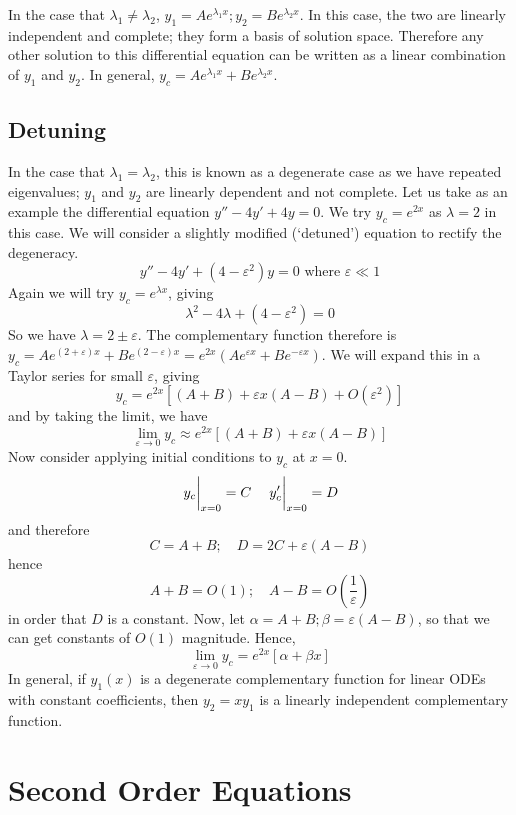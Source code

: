 \documentclass{article}
\begin{document}
In the case that $\lambda_1 \neq \lambda_2$, $y_1 = Ae^{\lambda_1 x}; y_2 = Be^{\lambda_2 x}$. In this case, the two are linearly independent and complete; they form a basis of solution space. Therefore any other solution to this differential equation can be written as a linear combination of $y_1$ and $y_2$. In general, $y_c = Ae^{\lambda_1 x} + Be^{\lambda_2 x}$.

\subsection{Detuning}
In the case that $\lambda_1 = \lambda_2$, this is known as a degenerate case as we have repeated eigenvalues; $y_1$ and $y_2$ are linearly dependent and not complete. Let us take as an example the differential equation $y'' - 4y' + 4y = 0$. We try $y_c = e^{2x}$ as $\lambda = 2$ in this case. We will consider a slightly modified (`detuned') equation to rectify the degeneracy.
\[ y'' - 4y' + (4-\varepsilon^2)y = 0 \text{ where } \varepsilon \ll 1 \]
Again we will try $y_c = e^{\lambda x}$, giving
\[ \lambda^2 - 4 \lambda + (4 - \varepsilon^2) = 0 \]
So we have $\lambda = 2 \pm \varepsilon$. The complementary function therefore is $y_c = Ae^{(2+\varepsilon)x} + Be^{(2-\varepsilon)x} = e^{2x}\left( Ae^{\varepsilon x} + Be^{-\varepsilon x} \right)$. We will expand this in a Taylor series for small $\varepsilon$, giving
\[ y_c = e^{2x}\left[ (A + B) + \varepsilon x(A - B) + O(\varepsilon^2) \right] \]
and by taking the limit, we have
\[ \lim_{\varepsilon \to 0} y_c \approx e^{2x} \left[ (A + B) + \varepsilon x(A - B) \right] \]
Now consider applying initial conditions to $y_c$ at $x = 0$.
\[ \eval{y_c}_{x=0} = C\quad \eval{y_c'}_{x=0} = D \]
and therefore
\[ C = A + B;\quad D = 2C + \varepsilon(A - B) \]
hence
\[ A + B = O(1);\quad A - B = O\left(\frac{1}{\varepsilon}\right) \]
in order that $D$ is a constant. Now, let $\alpha = A + B; \beta = \varepsilon(A - B)$, so that we can get constants of $O(1)$ magnitude. Hence,
\[ \lim_{\varepsilon \to 0} y_c = e^{2x}\left[ \alpha + \beta x \right] \]
In general, if $y_1(x)$ is a degenerate complementary function for linear ODEs with constant coefficients, then $y_2 = xy_1$ is a linearly independent complementary function.

\section{Second Order Equations}
\end{document}
